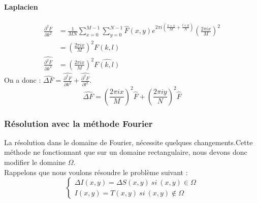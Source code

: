 \paragraph{Laplacien}
\begin{equation}
\begin{aligned}
\frac{\partial^2 F}{\partial k ^2} & = \frac{1}{MN} \sum_{x = 0}^{M-1} \sum_{y = 0}^{N-1} \widehat{F}(x,y) e^{2\pi i\left(\frac{k\times x}{M}+\frac{l\times y}{N}\right)}\left(\frac{2\pi i x}{M}\right)^2\\
& = \left(\frac{2\pi i x}{M}\right)^2 F(k,l)\\
\widehat{\frac{\partial^2 F}{\partial k^2}} &= \left(\frac{2\pi i x}{M}\right)^2\widehat{F(k,l)}
\end{aligned}
\end{equation}
On a donc : 
$\widehat{\Delta F} = \widehat{\frac{\partial^2 F}{\partial k^2}}+ \widehat{\frac{\partial^2 F}{\partial l^2}}$.
\begin{equation}
\widehat{\Delta F} = \left(\frac{2\pi i x}{M}\right)^2 \widehat{F}+\left(\frac{2\pi i y}{N}\right)^2 \widehat{F}
\end{equation}

\subsubsection{Résolution avec la méthode Fourier}
La résolution dans le domaine de Fourier, nécessite quelques changements.Cette méthode ne fonctionnant que sur un domaine rectangulaire, nous devons donc modifier le domaine $\Omega$.\\
Rappelons que nous voulons résoudre le problème suivant :
\begin{equation}
\left\{
\begin{aligned}
\Delta I(x,y) = \Delta S(x,y) \ si \ (x,y) \in \Omega\\
I(x,y) = T(x,y) \ si \ (x,y) \notin \Omega
\end{aligned}
\right.
\end{equation}

